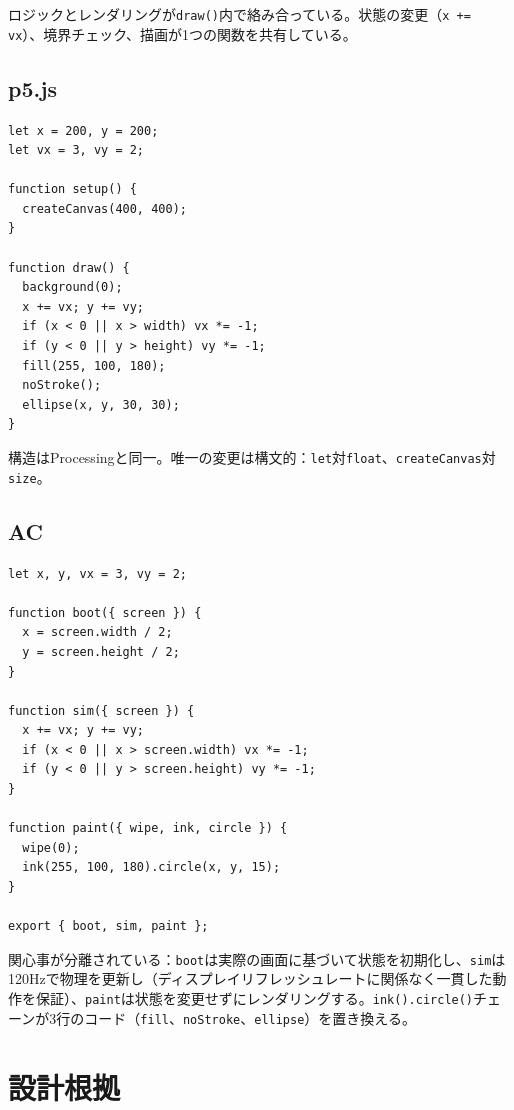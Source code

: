 \documentclass[10pt,letterpaper,twocolumn]{article}
\begin{document}
ロジックとレンダリングが\texttt{draw()}内で絡み合っている。状態の変更（\texttt{x += vx}）、境界チェック、描画が1つの関数を共有している。

\subsection{p5.js}

\begin{lstlisting}[style=p5style]
let x = 200, y = 200;
let vx = 3, vy = 2;

function setup() {
  createCanvas(400, 400);
}

function draw() {
  background(0);
  x += vx; y += vy;
  if (x < 0 || x > width) vx *= -1;
  if (y < 0 || y > height) vy *= -1;
  fill(255, 100, 180);
  noStroke();
  ellipse(x, y, 30, 30);
}
\end{lstlisting}

構造はProcessingと同一。唯一の変更は構文的：\texttt{let}対\texttt{float}、\texttt{createCanvas}対\texttt{size}。

\subsection{AC}

\begin{lstlisting}[style=acjsstyle]
let x, y, vx = 3, vy = 2;

function boot({ screen }) {
  x = screen.width / 2;
  y = screen.height / 2;
}

function sim({ screen }) {
  x += vx; y += vy;
  if (x < 0 || x > screen.width) vx *= -1;
  if (y < 0 || y > screen.height) vy *= -1;
}

function paint({ wipe, ink, circle }) {
  wipe(0);
  ink(255, 100, 180).circle(x, y, 15);
}

export { boot, sim, paint };
\end{lstlisting}

関心事が分離されている：\texttt{boot}は実際の画面に基づいて状態を初期化し、\texttt{sim}は120Hzで物理を更新し（ディスプレイリフレッシュレートに関係なく一貫した動作を保証）、\texttt{paint}は状態を変更せずにレンダリングする。\texttt{ink().circle()}チェーンが3行のコード（\texttt{fill}、\texttt{noStroke}、\texttt{ellipse}）を置き換える。


\section{設計根拠}
\label{sec:rationale}
\end{document}
